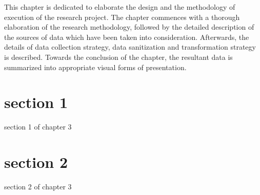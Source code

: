 This chapter is dedicated to elaborate the design and the methodology of execution of the research project. The chapter commences with a thorough elaboration of the research methodology, followed by the detailed description of the sources of data which have been taken into consideration. Afterwards, the details of data collection strategy, data sanitization and transformation strategy is described. Towards the conclusion of the chapter, the resultant data is summarized into appropriate visual forms of presentation.

\section{section 1}
section 1 of chapter 3
\section{section 2}
section 2 of chapter 3